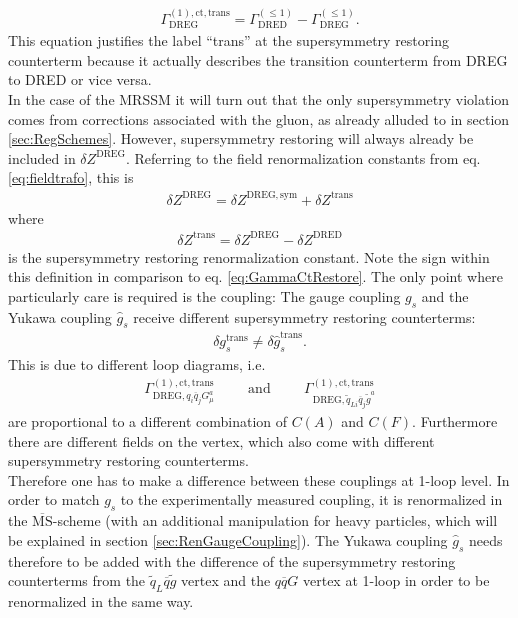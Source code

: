 \begin{align}
\Gamma^{\mathrm{(1),ct,trans}}_{\mathrm{DREG}} = \Gamma^{(\leq 1)}_{\mathrm{DRED}} - \Gamma^{(\leq 1)}_{\mathrm{DREG}}.\label{eq:GammaCtRestore}
\end{align} 
This equation justifies the label ``trans'' at the supersymmetry restoring counterterm because it actually describes the transition counterterm from DREG to DRED or vice versa.\\ %
In the case of the MRSSM it will turn out that the only supersymmetry violation comes from corrections associated with the gluon, as already alluded to in section \ref{sec:RegSchemes}. However, supersymmetry restoring will always already be included in $\delta Z^{\mathrm{DREG}}$. Referring to the field renormalization constants from eq. \eqref{eq:fieldtrafo}, this is 
\begin{align}
\delta Z^{\mathrm{DREG}} = \delta Z^{\mathrm{DREG,sym}} + \delta Z^{\mathrm{trans}}
\end{align}
where 
\begin{align}
\delta Z^{\mathrm{trans}} = \delta Z^{\mathrm{DREG}} - \delta Z^{\mathrm{DRED}}
\end{align}
is the supersymmetry restoring renormalization constant. Note the sign within this definition in comparison to eq. \eqref{eq:GammaCtRestore}. The only point where particularly care is required is the coupling: The  gauge coupling $g_s$ and the Yukawa coupling $\hat{g}_s$ receive different supersymmetry restoring counterterms:
\begin{align}
\delta g_s^{\mathrm{trans}} \neq \delta \hat{g}_s^{\mathrm{trans}}.
\end{align}
This is due to different loop diagrams, i.e. 
\begin{align}
\Gamma^{(1),\mathrm{ct,trans}}_{\mathrm{DREG},q_i \overline{q}_j G^a_\mu} \hspace{1cm} \mathrm{and} \hspace{1cm} \Gamma^{(1),\mathrm{ct,trans}}_{\mathrm{DREG},\tilde{q}_{Li} \overline{q}_j \tilde{g}^a}
\end{align}
are proportional to a different combination of $C(A)$ and $C(F)$. Furthermore there are different fields on the vertex, which also come with different supersymmetry restoring counterterms.\\
Therefore one has to make a difference between these couplings at 1-loop level. In order to match $g_s$ to the experimentally measured coupling, it is renormalized in the  $\overline{\mathrm{MS}}$-scheme (with an additional manipulation for heavy particles, which will be explained in section \ref{sec:RenGaugeCoupling}). The Yukawa coupling $\hat{g}_s$ needs therefore to be added with the difference of the supersymmetry restoring counterterms from the $\tilde{q}_L\overline{q}\tilde{g}$ vertex and the $q\overline{q}G$ vertex at 1-loop in order to be renormalized in the same way.



